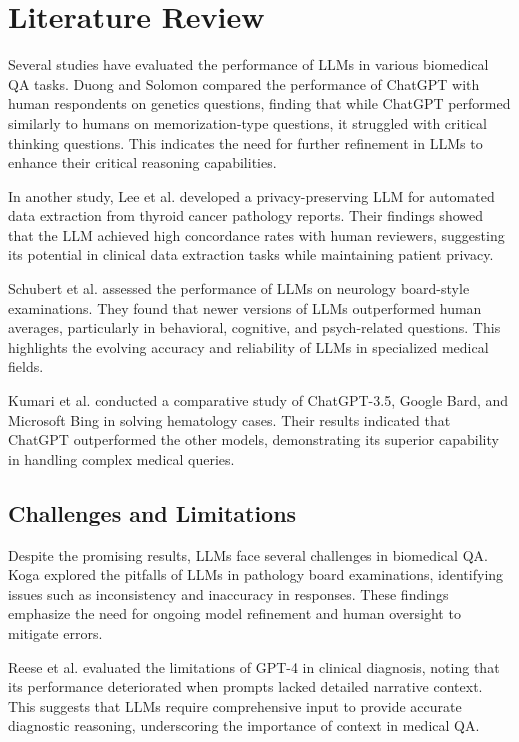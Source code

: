 \documentclass[onecolumn, conference]{IEEEtran}
\begin{document}
\section{Literature Review}

Several studies have evaluated the performance of LLMs in various biomedical QA tasks. Duong and Solomon \cite{Duong2023} compared the performance of ChatGPT with human respondents on genetics questions, finding that while ChatGPT performed similarly to humans on memorization-type questions, it struggled with critical thinking questions. This indicates the need for further refinement in LLMs to enhance their critical reasoning capabilities.

In another study, Lee et al. \cite{Lee2023} developed a privacy-preserving LLM for automated data extraction from thyroid cancer pathology reports. Their findings showed that the LLM achieved high concordance rates with human reviewers, suggesting its potential in clinical data extraction tasks while maintaining patient privacy.

Schubert et al. \cite{Schubert2023} assessed the performance of LLMs on neurology board-style examinations. They found that newer versions of LLMs outperformed human averages, particularly in behavioral, cognitive, and psych-related questions. This highlights the evolving accuracy and reliability of LLMs in specialized medical fields.

Kumari et al. \cite{Kumari2023} conducted a comparative study of ChatGPT-3.5, Google Bard, and Microsoft Bing in solving hematology cases. Their results indicated that ChatGPT outperformed the other models, demonstrating its superior capability in handling complex medical queries.

\subsection{Challenges and Limitations}
Despite the promising results, LLMs face several challenges in biomedical QA. Koga \cite{Koga2023} explored the pitfalls of LLMs in pathology board examinations, identifying issues such as inconsistency and inaccuracy in responses. These findings emphasize the need for ongoing model refinement and human oversight to mitigate errors.

Reese et al. \cite{Reese2023} evaluated the limitations of GPT-4 in clinical diagnosis, noting that its performance deteriorated when prompts lacked detailed narrative context. This suggests that LLMs require comprehensive input to provide accurate diagnostic reasoning, underscoring the importance of context in medical QA.
\end{document}
